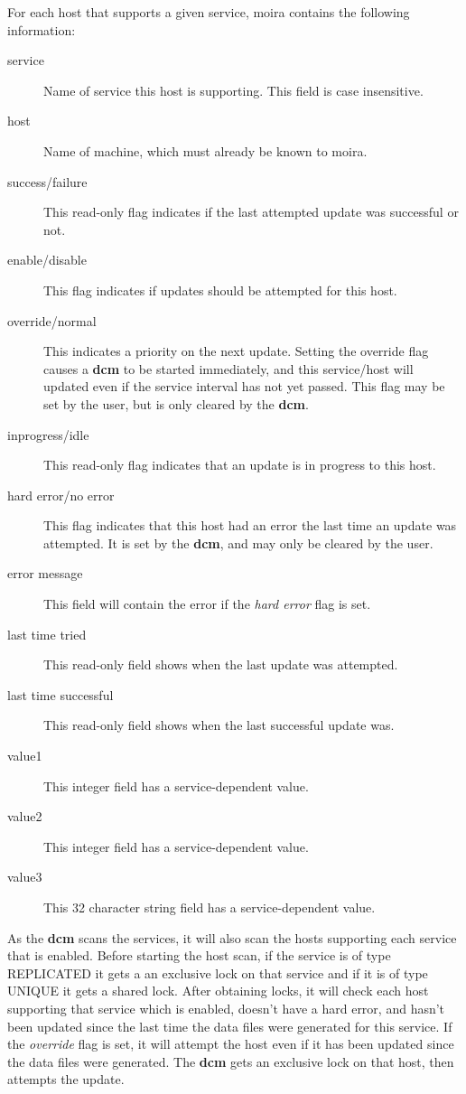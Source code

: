 For each host that supports a given service, moira contains the
following information:
\begin{description}
\item[service] Name of service this host is supporting.  This field is case
insensitive.
\item[host] Name of machine, which must already be known to moira.
\item[success/failure] This read-only flag indicates if the last attempted update was
successful or not.
\item[enable/disable] This flag indicates if updates should be attempted for
this host.
\item[override/normal] This indicates a priority on the next update.
Setting the override flag causes a {\bf dcm} to be started immediately,
and this service/host will updated even if the service interval has
not yet passed.  This flag may be set by the user, but is only cleared
by the {\bf dcm}.
\item[inprogress/idle] This read-only flag indicates that an update is in
progress to this host.
\item[hard error/no error] This flag indicates that this host had an error
the last time an update was attempted.  It is set by the {\bf dcm}, and
may only be cleared by the user.
\item[error message] This field will contain the error if the {\em hard error}
flag is set.
\item[last time tried] This read-only field shows when the last update was
attempted.
\item[last time successful] This read-only field shows when the last
successful update was.
\item[value1] This integer field has a service-dependent value.
\item[value2] This integer field has a service-dependent value.
\item[value3] This 32 character string field has a service-dependent value.
\end{description}

As the {\bf dcm} scans the services, it will also scan the hosts
supporting each service that is enabled.  Before starting the host
scan, if the service is of type REPLICATED it gets a an exclusive lock
on that service and if it is of type UNIQUE it gets a shared lock.
After obtaining locks, it will check each host supporting that service
which is enabled, doesn't have a hard error, and hasn't been updated
since the last time the data files were generated for this service.
If the {\em override} flag is set, it will attempt the host even if it
has been updated since the data files were generated.  The {\bf dcm}
gets an exclusive lock on that host, then attempts the update.

